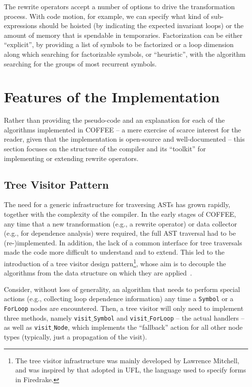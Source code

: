 The rewrite operators accept a number of options to drive the transformation process. With code motion, for example, we can specify what kind of sub-expressions should be hoisted (by indicating the expected invariant loops) or the amount of memory that is spendable in temporaries. Factorization can be either ``explicit'', by providing a list of symbols to be factorized or a loop dimension along which searching for factorizable symbols, or ``heuristic'', with the algorithm searching for the groups of most recurrent symbols.

\section{Features of the Implementation}
Rather than providing the pseudo-code and an explanation for each of the algorithms implemented in COFFEE -- a mere exercise of scarce interest for the reader, given that the implementation is open-source and well-documented -- this section focuses on the structure of the compiler and its ``toolkit'' for implementing or extending rewrite operators.

\subsection{Tree Visitor Pattern}
The need for a generic infrastructure for traversing ASTs has grown rapidly, together with the complexity of the compiler. In the early stages of COFFEE, any time that a new transformation (e.g., a rewrite operator) or data collector (e.g., for dependence analysis) were required, the full AST traversal had to be (re-)implemented. In addition, the lack of a common interface for tree traversals made the code more difficult to understand and to extend. This led to the introduction of a tree visitor design pattern\footnote{The tree visitor infrastructure was mainly developed by Lawrence Mitchell, and was inspired by that adopted in UFL, the language used to specify forms in Firedrake.}, whose aim is to decouple the algorithms from the data structure on which they are applied~\cite{wiki-tree-visitors}. 

Consider, without loss of generality, an algorithm that needs to perform special actions (e.g., collecting loop dependence information) any time a \texttt{Symbol} or a \texttt{ForLoop} nodes are encountered. Then, a tree visitor will only need to implement three methods, namely \texttt{visit$\_$Symbol} and \texttt{visit$\_$ForLoop} -- the actual handlers -- as well as \texttt{visit$\_$Node}, which implements the ``fallback'' action for all other node types (typically, just a propagation of the visit).


